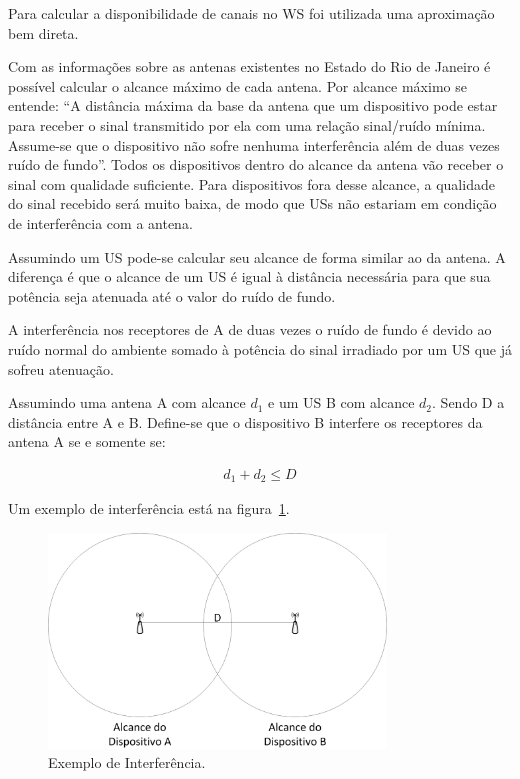 Para calcular a disponibilidade de canais no WS foi utilizada uma aproximação bem direta. 

Com as informações sobre as antenas existentes no Estado do Rio de Janeiro é possível calcular o alcance máximo de cada antena. Por alcance máximo se entende: ``A distância máxima da base da antena que um dispositivo pode estar para receber o sinal transmitido por ela com uma relação sinal/ruído mínima. Assume-se que o dispositivo não sofre nenhuma interferência além de duas vezes ruído de fundo''. Todos os dispositivos dentro do alcance da antena vão receber o sinal com qualidade suficiente. Para dispositivos fora desse alcance, a qualidade do sinal recebido será muito baixa, de modo que USs não estariam em condição de interferência com a antena.

Assumindo um US pode-se calcular seu alcance de forma similar ao da antena. A diferença é que o alcance de um US é igual à distância necessária para que sua potência seja atenuada até o valor do ruído de fundo.

A interferência nos receptores de A de duas vezes o ruído de fundo é devido ao ruído normal do ambiente somado à potência do sinal irradiado por um US que já sofreu atenuação.

Assumindo uma antena A com alcance \begin{math}d_1\end{math} e um US B com alcance \begin{math}d_2\end{math}. Sendo D a distância entre A e B. Define-se que o dispositivo B interfere os receptores da antena A se e somente se:

\begin{align}
  \label{interfere} d_1 + d_2 \leq D
\end{align}


Um exemplo de interferência está na figura~\ref{fig:interf}.

\begin{figure}[htb]
\centering
\includegraphics[width=0.8\textwidth]{figs/Interf}
\caption[\textit{Interferência}.]
{Exemplo de Interferência.}
\label{fig:interf}
\end{figure} 

